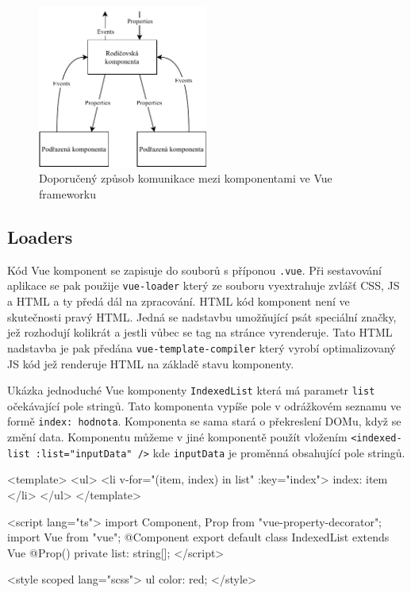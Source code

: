 \begin{figure}[h]
    \centering
    \includegraphics[width=0.5\textwidth]{media/vue.pdf}
    \caption{Doporučený způsob komunikace mezi komponentami ve Vue frameworku}
\end{figure}

\subsection{Loaders}
Kód Vue komponent se zapisuje do souborů s příponou \texttt{.vue}. Při sestavování aplikace se pak použije \texttt{vue-loader} který ze souboru vyextrahuje zvlášť CSS, JS a HTML a ty předá dál na zpracování. HTML kód komponent není ve skutečnosti pravý HTML. Jedná se nadstavbu umožňující psát speciální značky, jež rozhodují kolikrát a jestli vůbec se tag na stránce vyrenderuje. Tato HTML nadstavba je pak předána \texttt{vue-template-compiler} který vyrobí optimalizovaný JS kód jež renderuje HTML na základě stavu komponenty.

\newpage

\begin{prikl}
Ukázka jednoduché Vue komponenty \texttt{IndexedList} která má parametr \texttt{list} očekávající pole stringů. Tato komponenta vypíše pole v odrážkovém seznamu ve formě \texttt{index: hodnota}. Komponenta se sama stará o překreslení DOMu, když se změní data. Komponentu můžeme v jiné komponentě použít vložením \texttt{<indexed-list :list="inputData" />} kde \texttt{inputData} je proměnná obsahující pole stringů.

\begin{code}
<template>
  <ul>
    <li v-for="(item, index) in list" :key="index">
      {{index}}: {{ item }}
    </li>
  </ul>
</template>

<script lang="ts">
  import {Component, Prop} from "vue-property-decorator";
  import Vue from "vue";
  @Component
  export default class IndexedList extends Vue {
    @Prop() private list: string[];
  }
</script>

<style scoped lang="scss">
  ul {
    color: red;
  }
</style>
\end{code}
\end{prikl}

